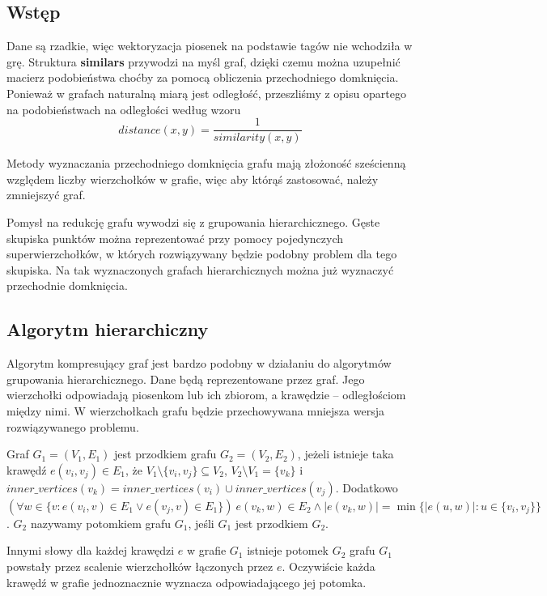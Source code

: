\documentclass[a4paper,10pt]{article}
\begin{document}
\subsection{Wstęp}
Dane są rzadkie, więc wektoryzacja piosenek na podstawie tagów nie wchodziła w grę. 
Struktura \textbf{similars} przywodzi na myśl graf, dzięki czemu można uzupełnić macierz podobieństwa choćby za pomocą obliczenia przechodniego domknięcia.
Ponieważ w grafach naturalną miarą jest odległość, przeszliśmy z opisu opartego na podobieństwach na odległości według wzoru
\begin{equation}
 distance(x, y) = \frac{1}{similarity(x, y)}
\end{equation}

Metody wyznaczania przechodniego domknięcia grafu mają złożoność sześcienną względem liczby wierzchołków w grafie, 
więc aby którąś zastosować, należy zmniejszyć graf.

Pomysł na redukcję grafu wywodzi się z grupowania hierarchicznego.
Gęste skupiska punktów można reprezentować przy pomocy pojedynczych superwierzchołków, w których rozwiązywany będzie podobny problem dla tego skupiska.
Na tak wyznaczonych grafach hierarchicznych można już wyznaczyć przechodnie domknięcia.

\subsection{Algorytm hierarchiczny}
Algorytm kompresujący graf jest bardzo podobny w działaniu do algorytmów grupowania hierarchicznego.
Dane będą reprezentowane przez graf. Jego wierzchołki odpowiadają piosenkom lub ich zbiorom, a krawędzie -- odległościom między nimi.
W wierzchołkach grafu będzie przechowywana mniejsza wersja rozwiązywanego problemu.

Graf $G_1 = (V_1, E_1)$ jest przodkiem grafu $G_2 = (V_2, E_2)$, jeżeli istnieje taka krawędź $e(v_i, v_j) \in E_1$, że $V_1 \setminus \{v_i, v_j\} \subseteq V_2$, 
$V_2 \setminus V_1 = \{v_k\}$ i $inner\_vertices(v_k) = inner\_vertices(v_i) \cup inner\_vertices(v_j)$.\linebreak
Dodatkowo $(\forall w \in \{v: e(v_i, v) \in E_1 \vee e(v_j, v) \in E_1\})~e(v_k, w) \in E_2 \wedge |e(v_k, w)| = \min \{|e(u, w)| : u \in \{v_i, v_j\}\}$.
$G_2$ nazywamy potomkiem grafu $G_1$, jeśli $G_1$ jest przodkiem $G_2$.

Innymi słowy dla każdej krawędzi $e$ w grafie $G_1$ istnieje potomek $G_2$ grafu $G_1$ powstały przez scalenie wierzchołków łączonych przez $e$.
Oczywiście każda krawędź w grafie jednoznacznie wyznacza odpowiadającego jej potomka.
\end{document}
